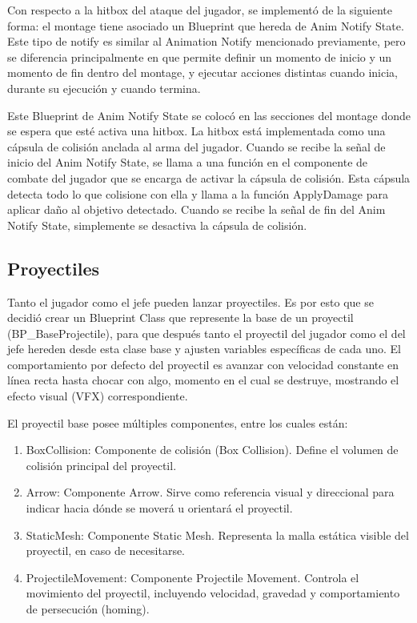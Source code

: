 \documentclass[informe]{upropuesta}
\begin{document}
Con respecto a la hitbox del ataque del jugador, se implementó de la siguiente forma: el montage tiene asociado un Blueprint que hereda de Anim Notify State. Este tipo de notify es similar al Animation Notify mencionado previamente, pero se diferencia principalmente en que permite definir un momento de inicio y un momento de fin dentro del montage, y ejecutar acciones distintas cuando inicia, durante su ejecución y cuando termina.

Este Blueprint de Anim Notify State se colocó en las secciones del montage donde se espera que esté activa una hitbox. La hitbox está implementada como una cápsula de colisión anclada al arma del jugador. Cuando se recibe la señal de inicio del Anim Notify State, se llama a una función en el componente de combate del jugador que se encarga de activar la cápsula de colisión. Esta cápsula detecta todo lo que colisione con ella y llama a la función ApplyDamage para aplicar daño al objetivo detectado. Cuando se recibe la señal de fin del Anim Notify State, simplemente se desactiva la cápsula de colisión.




\subsection{Proyectiles}

Tanto el jugador como el jefe pueden lanzar proyectiles. Es por esto que se decidió crear un Blueprint Class que represente la base de un proyectil (BP\_BaseProjectile), para que después tanto el proyectil del jugador como el del jefe hereden desde esta clase base y ajusten variables específicas de cada uno. El comportamiento por defecto del proyectil es avanzar con velocidad constante en línea recta hasta chocar con algo, momento en el cual se destruye, mostrando el efecto visual (VFX) correspondiente.

El proyectil base posee múltiples componentes, entre los cuales están:

\begin{enumerate}
    \item BoxCollision: Componente de colisión (Box Collision). Define el volumen de colisión principal del proyectil.
    \item Arrow: Componente Arrow. Sirve como referencia visual y direccional para indicar hacia dónde se moverá u orientará el proyectil.
    \item StaticMesh: Componente Static Mesh. Representa la malla estática visible del proyectil, en caso de necesitarse.
    \item ProjectileMovement: Componente Projectile Movement. Controla el movimiento del proyectil, incluyendo velocidad, gravedad y comportamiento de persecución (homing).
\end{enumerate}
\end{document}
